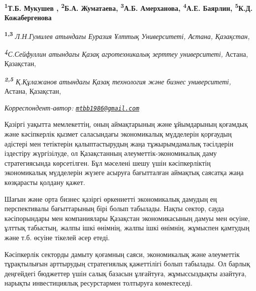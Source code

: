 
\begin{articleheader}

{\bfseries
\textsuperscript{1}Т.Б. Мукушев\textsuperscript{\envelope } \authorid,
\textsuperscript{2}Б.А. Жуматаева\authorid,
\textsuperscript{3}А.Б. Амерханова\authorid,
\textsuperscript{4}А.Е. Баярлин\authorid,
\textsuperscript{5}К.Д. Кожабергенова\authorid}
\end{articleheader}

\begin{affiliation}
{\bfseries \textsuperscript{1,3}} \emph{Л.Н.Гумилев атындағы Еуразия Ұлттық Университеті, Астана, Қазақстан,}

\emph{{\bfseries \textsuperscript{4}}С.Сейфуллин атындағы Қазақ агротехникалық зерттеу университеті,} Астана, Қазақстан,

\emph{{\bfseries \textsuperscript{2,5}} Қ.Құлажанов атындағы Қазақ технология және бизнес университеті,} Астана, Қазақстан,

\raggedright \textsuperscript{\envelope }{\em Корреспондент-автор: \href{mailto:mtbb1986@gmail.com}{\nolinkurl{mtbb1986@gmail.com}}}
\end{affiliation}

Қазіргі уақытта мемлекеттің, оның аймақтарының және ұйымдарының қоғамдық
және кәсіпкерлік қызмет саласындағы экономикалық мүдделерін қорғаудың
әдістері мен тетіктерін қалыптастырудың жаңа тұжырымдамалық тәсілдерін
іздестіру жүргізілуде, ол Қазақстанның әлеуметтік-экономикалық даму
стратегиясында көрсетілген. Бұл мәселені шешу үшін кәсіпкерліктің
экономикалық мүдделерін жүзеге асыруға бағытталған аймақтық саясатқа
жаңа көзқарасты қолдану қажет.

Шағын және орта бизнес қазіргі өркениетті экономикалық дамудың ең
перспективалы бағыттарының бірі болып табылады. Нақты сектор, сауда
кәсіпорындары мен компаниялары Қазақстан экономикасының дамуы мен
өсуіне, ұлттық табыстың, жалпы ішкі өнімнің, жалпы ішкі өнімнің,
жұмыспен қамтудың және т.б. өсуіне тікелей әсер етеді.

Кәсіпкерлік секторды дамыту қоғамның саяси, экономикалық және әлеуметтік
тұрақтылығын арттырудың стратегиялық қажеттілігі болып табылады. Ол
барлық деңгейдегі бюджеттер үшін салық базасын ұлғайтуға, жұмыссыздықты
азайтуға, нарықты инвестициялық ресурстармен толтыруға көмектеседі.

